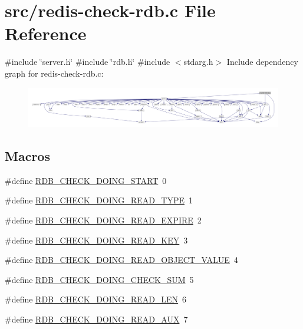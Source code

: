 \hypertarget{redis-check-rdb_8c}{}\section{src/redis-\/check-\/rdb.c File Reference}
\label{redis-check-rdb_8c}
{\ttfamily \#include \char`\"{}server.\+h\char`\"{}}\newline
{\ttfamily \#include \char`\"{}rdb.\+h\char`\"{}}\newline
{\ttfamily \#include $<$stdarg.\+h$>$}\newline
Include dependency graph for redis-\/check-\/rdb.c\+:
\nopagebreak
\begin{figure}[H]
\begin{center}
\leavevmode
\includegraphics[width=350pt]{redis-check-rdb_8c__incl}
\end{center}
\end{figure}
\subsection*{Macros}
\begin{DoxyCompactItemize}
\item 
\#define \hyperlink{redis-check-rdb_8c_ac2019807002ea1b82f0ef5a81d3b6f2a}{R\+D\+B\+\_\+\+C\+H\+E\+C\+K\+\_\+\+D\+O\+I\+N\+G\+\_\+\+S\+T\+A\+RT}~0
\item 
\#define \hyperlink{redis-check-rdb_8c_aa0a7dfd3a3e0ac75d688d559a3704bc4}{R\+D\+B\+\_\+\+C\+H\+E\+C\+K\+\_\+\+D\+O\+I\+N\+G\+\_\+\+R\+E\+A\+D\+\_\+\+T\+Y\+PE}~1
\item 
\#define \hyperlink{redis-check-rdb_8c_a1ea6b327825b203156f25d5690203cc9}{R\+D\+B\+\_\+\+C\+H\+E\+C\+K\+\_\+\+D\+O\+I\+N\+G\+\_\+\+R\+E\+A\+D\+\_\+\+E\+X\+P\+I\+RE}~2
\item 
\#define \hyperlink{redis-check-rdb_8c_a502536e7d64001543187d790a8dc48af}{R\+D\+B\+\_\+\+C\+H\+E\+C\+K\+\_\+\+D\+O\+I\+N\+G\+\_\+\+R\+E\+A\+D\+\_\+\+K\+EY}~3
\item 
\#define \hyperlink{redis-check-rdb_8c_ac6a3f6afcf1b09f47ba08a73ae925fc8}{R\+D\+B\+\_\+\+C\+H\+E\+C\+K\+\_\+\+D\+O\+I\+N\+G\+\_\+\+R\+E\+A\+D\+\_\+\+O\+B\+J\+E\+C\+T\+\_\+\+V\+A\+L\+UE}~4
\item 
\#define \hyperlink{redis-check-rdb_8c_aa43bb9440ce7c820f089f811cb19a790}{R\+D\+B\+\_\+\+C\+H\+E\+C\+K\+\_\+\+D\+O\+I\+N\+G\+\_\+\+C\+H\+E\+C\+K\+\_\+\+S\+UM}~5
\item 
\#define \hyperlink{redis-check-rdb_8c_ad444ed91923ac86310ebd17eb5525cae}{R\+D\+B\+\_\+\+C\+H\+E\+C\+K\+\_\+\+D\+O\+I\+N\+G\+\_\+\+R\+E\+A\+D\+\_\+\+L\+EN}~6
\item 
\#define \hyperlink{redis-check-rdb_8c_a14dfe6627d1d6293301b16939723a12e}{R\+D\+B\+\_\+\+C\+H\+E\+C\+K\+\_\+\+D\+O\+I\+N\+G\+\_\+\+R\+E\+A\+D\+\_\+\+A\+UX}~7
\end{DoxyCompactItemize}
